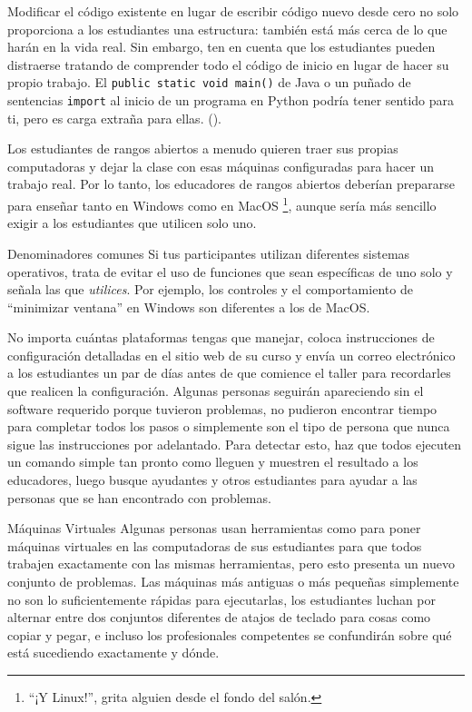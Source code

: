Modificar el código existente en lugar de escribir código nuevo desde cero
no solo proporciona a los estudiantes una estructura:
también está más cerca de lo que harán en la vida real.
Sin embargo,
ten en cuenta que los estudiantes pueden distraerse tratando de comprender todo el código de inicio
en lugar de hacer su propio trabajo.
El \texttt{public static void main()} de Java
o un puñado de sentencias \texttt{import} al inicio de un programa en Python
podría tener sentido para ti,
pero es carga extraña para ellas. ().


Los estudiantes de rangos abiertos a menudo quieren traer sus propias computadoras
y dejar la clase con esas máquinas configuradas para hacer un trabajo real.
Por lo tanto, los educadores de rangos abiertos deberían prepararse para enseñar tanto en Windows como en MacOS \footnote{``¡Y Linux!'', grita alguien desde el fondo del salón.},
aunque sería más sencillo exigir a los estudiantes que utilicen solo uno.

\begin{aside}{Denominadores comunes}
  Si tus participantes utilizan diferentes sistemas operativos,
  trata de evitar el uso de funciones que sean específicas de uno solo
  y señala las que \emph{utilices}.
  Por ejemplo,
  los controles y el comportamiento de ``minimizar ventana'' en Windows son diferentes
  a los de MacOS.
\end{aside}

No importa cuántas plataformas tengas que manejar,
coloca instrucciones de configuración detalladas en el sitio web de su curso
y envía un correo electrónico a los estudiantes un par de días antes de que comience el taller
para recordarles que realicen la configuración.
Algunas personas seguirán apareciendo sin el software requerido porque
tuvieron problemas,
no pudieron encontrar tiempo para completar todos los pasos
o simplemente son el tipo de persona que nunca sigue las instrucciones por adelantado.
Para detectar esto,
haz que todos ejecuten un comando simple tan pronto como lleguen
y muestren el resultado a los educadores,
luego busque ayudantes y otros estudiantes
para ayudar a las personas que se han encontrado con problemas.

\begin{aside}{Máquinas Virtuales}
  Algunas personas usan herramientas como 
  para poner máquinas virtuales en las computadoras de sus estudiantes
  para que todos trabajen exactamente con las mismas herramientas,
  pero esto presenta un nuevo conjunto de problemas.
  Las máquinas más antiguas o más pequeñas simplemente no son lo suficientemente rápidas para ejecutarlas,
  los estudiantes luchan por alternar
  entre dos conjuntos diferentes de atajos de teclado para cosas como copiar y pegar,
  e incluso los profesionales competentes se confundirán sobre qué está sucediendo exactamente y dónde.
\end{aside}

